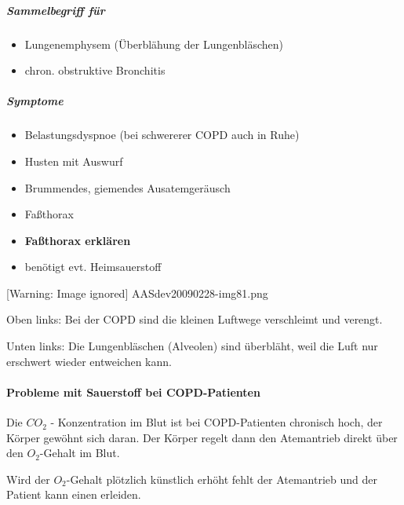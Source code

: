 \subparagraph*{Sammelbegriff f\"ur}

\begin{itemize}
    \item Lungenemphysem (\"Uberblähung der Lungenbläschen)
    \item chron. obstruktive Bronchitis
\end{itemize}

\subparagraph*{Symptome}

\begin{itemize}
    \item Belastungsdyspnoe (bei schwererer COPD auch in Ruhe)
    
    \item Husten mit Auswurf
    
    \item Brummendes, giemendes Ausatemgeräusch
    
    \item Fa{\ss}thorax
    
    \item {\bfseries\color[rgb]{0.5019608,0.0,0.0}
    Fa{\ss}thorax erklären}
    
    \item ben\"otigt evt. Heimsauerstoff
    
\end{itemize}
[Warning: Image ignored] {AASdev20090228-img81.png}

Oben links: Bei der COPD sind die kleinen Luftwege verschleimt und
verengt.

Unten links: Die Lungenbläschen (Alveolen) sind \"uberbläht, weil
die Luft nur erschwert wieder entweichen kann. 

\paragraph*{Probleme mit Sauerstoff bei COPD-Patienten}
Die $CO_2$ - Konzentration im Blut ist bei COPD-Patienten chronisch hoch,
der K\"orper gew\"ohnt sich daran. Der K\"orper regelt dann den
Atemantrieb direkt \"uber den $O_2$-Gehalt im Blut. 

Wird der $O_2$-Gehalt pl\"otzlich k\"unstlich erh\"oht fehlt der
Atemantrieb und der Patient kann einen
 erleiden. 

